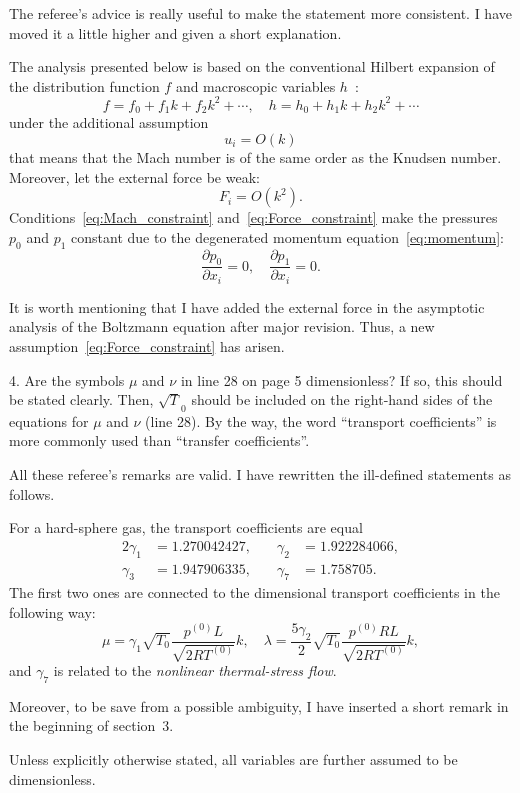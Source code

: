 \documentclass{article}
\newcommand{\pder}[2][]{\frac{\partial#1}{\partial#2}}
\begin{document}
The referee's advice is really useful to make the statement more consistent.
I have moved it a little higher and given a short explanation.

\begin{leftbar}
The analysis presented below is based on the conventional Hilbert expansion
of the distribution function \(f\) and macroscopic variables \(h\)~\cite{Hilbert1912}:
\[ f = f_0 + f_1k + f_2k^2 + \cdots, \quad h = h_0 + h_1k + h_2k^2 + \cdots \]
under the additional assumption
\begin{equation}\label{eq:Mach_constraint}
	u_i = O(k)
\end{equation}
that means that the Mach number is of the same order as the Knudsen number.
Moreover, let the external force be weak:
\begin{equation}\label{eq:Force_constraint}
	F_i = O(k^2).
\end{equation}
Conditions~\eqref{eq:Mach_constraint} and~\eqref{eq:Force_constraint} make the pressures
\(p_0\) and \(p_1\) constant due to the degenerated momentum equation~\eqref{eq:momentum}:
\begin{equation}
	\pder[p_0]{x_i} = 0, \quad \pder[p_1]{x_i} = 0.
\end{equation}
\end{leftbar}
It is worth mentioning that I have added the external force in the asymptotic analysis of
the Boltzmann equation after major revision.
Thus, a new assumption~\eqref{eq:Force_constraint} has arisen. 

\begin{quoting} 
4. Are the symbols \(\mu\) and \(\nu\) in line 28 on page 5 dimensionless?
If so, this should be stated clearly. Then, \(\sqrt T_0\) should be
included on the right-hand sides of the equations for \(\mu\) and
\(\nu\) (line 28). By the way, the word ``transport coefficients'' is
more commonly used than ``transfer coefficients''.
\end{quoting}

All these referee's remarks are valid. I have rewritten the ill-defined statements as follows.
\begin{leftbar}
For a hard-sphere gas, the transport coefficients are equal
\begin{alignat*}{2}
	\gamma_1 &= 1.270042427, &\quad \gamma_2 &= 1.922284066, \\
	\gamma_3 &= 1.947906335, &\quad \gamma_7 &= 1.758705.
\end{alignat*}
The first two ones are connected to the dimensional transport coefficients in the following way:
\begin{equation}
	\mu = \gamma_1\sqrt{T_0} \frac{p^{(0)}L}{\sqrt{2RT^{(0)}}} k, \quad
	\lambda = \frac{5\gamma_2}{2}\sqrt{T_0} \frac{p^{(0)}RL}{\sqrt{2RT^{(0)}}} k,
\end{equation}	
and \(\gamma_7\) is related to the \emph{nonlinear thermal-stress flow}.
\end{leftbar}
Moreover, to be save from a possible ambiguity,
I have inserted a short remark in the beginning of section~3.
\begin{leftbar}
Unless explicitly otherwise stated, all variables are further assumed to be dimensionless.
\end{leftbar}
\end{document}

